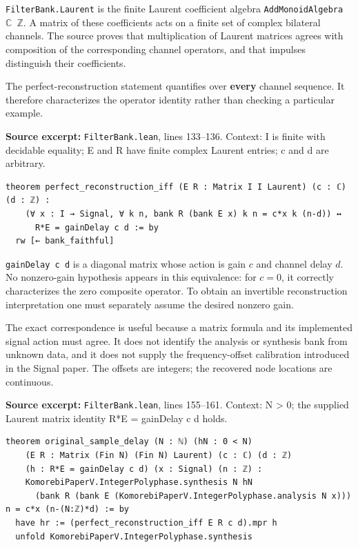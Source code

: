 \documentclass[11pt]{article}
\begin{document}
\texttt{FilterBank.Laurent} is the finite Laurent coefficient algebra \texttt{AddMonoidAlgebra \ensuremath{\mathbb C} \ensuremath{\mathbb Z}}. A matrix of these coefficients acts on a finite set of complex bilateral channels. The source proves that multiplication of Laurent matrices agrees with composition of the corresponding channel operators, and that impulses distinguish their coefficients.

The perfect-reconstruction statement quantifies over \textbf{every} channel sequence. It therefore characterizes the operator identity rather than checking a particular example.

\textbf{Source excerpt:} \texttt{FilterBank.lean}, lines 133--136. Context: I is finite with decidable equality; E and R have finite complex Laurent entries; c and d are arbitrary.

\begin{minipage}{\linewidth}
\begin{lstlisting}
theorem perfect_reconstruction_iff (E R : Matrix I I Laurent) (c : ℂ) (d : ℤ) :
    (∀ x : I → Signal, ∀ k n, bank R (bank E x) k n = c*x k (n-d)) ↔
      R*E = gainDelay c d := by
  rw [← bank_faithful]
\end{lstlisting}
\end{minipage}\par

\texttt{gainDelay c d} is a diagonal matrix whose action is gain \(c\) and channel delay \(d\). No nonzero-gain hypothesis appears in this equivalence: for \(c=0\), it correctly characterizes the zero composite operator. To obtain an invertible reconstruction interpretation one must separately assume the desired nonzero gain.

The exact correspondence is useful because a matrix formula and its implemented signal action must agree. It does not identify the analysis or synthesis bank from unknown data, and it does not supply the frequency-offset calibration introduced in the Signal paper. The offsets are integers; the recovered node locations are continuous.

\textbf{Source excerpt:} \texttt{FilterBank.lean}, lines 155--161. Context: N \textgreater{} 0; the supplied Laurent matrix identity R*E = gainDelay c d holds.

\begin{minipage}{\linewidth}
\begin{lstlisting}
theorem original_sample_delay (N : ℕ) (hN : 0 < N)
    (E R : Matrix (Fin N) (Fin N) Laurent) (c : ℂ) (d : ℤ)
    (h : R*E = gainDelay c d) (x : Signal) (n : ℤ) :
    KomorebiPaperV.IntegerPolyphase.synthesis N hN
      (bank R (bank E (KomorebiPaperV.IntegerPolyphase.analysis N x))) n = c*x (n-(N:ℤ)*d) := by
  have hr := (perfect_reconstruction_iff E R c d).mpr h
  unfold KomorebiPaperV.IntegerPolyphase.synthesis
\end{lstlisting}
\end{minipage}\par
\end{document}
